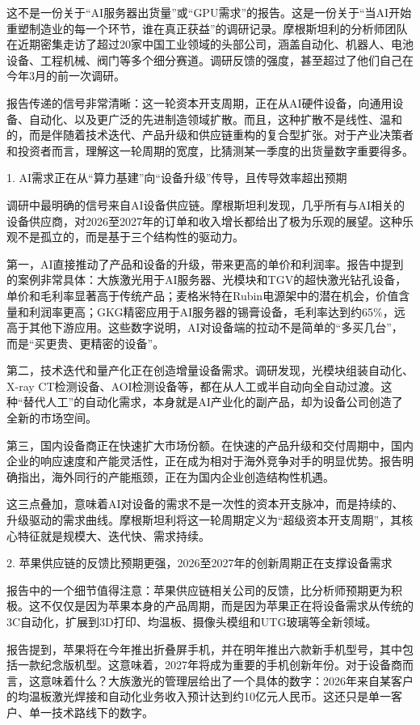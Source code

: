 \documentclass[11pt]{ctexart}
\begin{document}
这不是一份关于“AI服务器出货量”或“GPU需求”的报告。这是一份关于“当AI开始重塑制造业的每一个环节，谁在真正获益”的调研记录。摩根斯坦利的分析师团队在近期密集走访了超过20家中国工业领域的头部公司，涵盖自动化、机器人、电池设备、工程机械、阀门等多个细分赛道。调研反馈的强度，甚至超过了他们自己在今年3月的前一次调研。

报告传递的信号非常清晰：这一轮资本开支周期，正在从AI硬件设备，向通用设备、自动化、以及更广泛的先进制造领域扩散。而且，这种扩散不是线性、温和的，而是伴随着技术迭代、产品升级和供应链重构的复合型扩张。对于产业决策者和投资者而言，理解这一轮周期的宽度，比猜测某一季度的出货量数字重要得多。

1. AI需求正在从“算力基建”向“设备升级”传导，且传导效率超出预期

调研中最明确的信号来自AI设备供应链。摩根斯坦利发现，几乎所有与AI相关的设备供应商，对2026至2027年的订单和收入增长都给出了极为乐观的展望。这种乐观不是孤立的，而是基于三个结构性的驱动力。

第一，AI直接推动了产品和设备的升级，带来更高的单价和利润率。报告中提到的案例非常具体：大族激光用于AI服务器、光模块和TGV的超快激光钻孔设备，单价和毛利率显著高于传统产品；麦格米特在Rubin电源架中的潜在机会，价值含量和利润率更高；GKG精密应用于AI服务器的锡膏设备，毛利率达到约65\%，远高于其他下游应用。这些数字说明，AI对设备端的拉动不是简单的“多买几台”，而是“买更贵、更精密的设备”。

第二，技术迭代和量产化正在创造增量设备需求。调研发现，光模块组装自动化、X-ray CT检测设备、AOI检测设备等，都在从人工或半自动向全自动过渡。这种“替代人工”的自动化需求，本身就是AI产业化的副产品，却为设备公司创造了全新的市场空间。

第三，国内设备商正在快速扩大市场份额。在快速的产品升级和交付周期中，国内企业的响应速度和产能灵活性，正在成为相对于海外竞争对手的明显优势。报告明确指出，海外同行的产能瓶颈，正在为国内企业创造结构性机遇。

这三点叠加，意味着AI对设备的需求不是一次性的资本开支脉冲，而是持续的、升级驱动的需求曲线。摩根斯坦利将这一轮周期定义为“超级资本开支周期”，其核心特征就是规模大、迭代快、需求持续。

2. 苹果供应链的反馈比预期更强，2026至2027年的创新周期正在支撑设备需求

报告中的一个细节值得注意：苹果供应链相关公司的反馈，比分析师预期更为积极。这不仅仅是因为苹果本身的产品周期，而是因为苹果正在将设备需求从传统的3C自动化，扩展到3D打印、均温板、摄像头模组和UTG玻璃等全新领域。

报告提到，苹果将在今年推出折叠屏手机，并在明年推出六款新手机型号，其中包括一款纪念版机型。这意味着，2027年将成为重要的手机创新年份。对于设备商而言，这意味着什么？大族激光的管理层给出了一个具体的数字：2026年来自某客户的均温板激光焊接和自动化业务收入预计达到约10亿元人民币。这还只是单一客户、单一技术路线下的数字。
\end{document}
